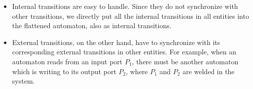 

\begin{itemize}
    \item Internal transitions are easy to handle. Since they do not synchronize with other transitions, we directly put all the internal transitions in all entities into the flattened automaton, also as internal transitions.
    \item External transitions, on the other hand, have to synchronize with its corresponding external transitions in other entities. For example, when an automaton reads from an input port $P_1$, there must be another automaton which is writing to its output port $P_2$, where $P_1$ and $P_2$ are welded in the system. 
\end{itemize}

